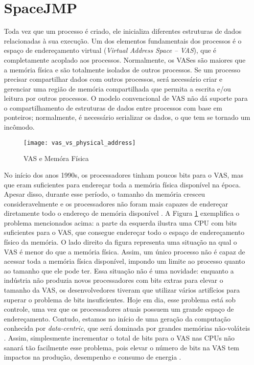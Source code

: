 \section{SpaceJMP}
\label{sec:mvas}

Toda vez que um processo é criado, ele inicializa diferentes estruturas de
dados relacionadas à sua execução. Um dos elementos fundamentais dos processos
é o espaço de endereçamento virtual (\emph{Virtual Address Space -- VAS}), que é
completamente acoplado aos processos. Normalmente, os VASes são maiores que a
memória física e são totalmente isolados de outros processos. Se um processo
precisar compartilhar dados com outros processos, será necessário criar e
gerenciar uma região de memória compartilhada que permita a escrita e/ou leitura
por outros processos. O modelo convencional de VAS não dá suporte para
o compartilhamento de estruturas de dados entre processos com base em ponteiros;
normalmente, é necessário serializar os dados, o que tem se tornado um incômodo.

\begin{figure}[!h]
  \centering
  \texttt{[image: vas\_vs\_physical\_address]} 
  \caption{VAS e Memóra Física}
  \label{fig:vas_vs_physical} 
\end{figure}

No início dos anos 1990s, os processadores tinham poucos bits para o VAS, mas que eram suficientes
para endereçar toda a memória física disponível na época. Apesar disso, durante
esse período, o tamanho da memória cresceu consideravelmente e os processadores
não foram mais capazes de endereçar diretamente todo o endereço de memória disponível
\citep{crowley}. A Figura \ref{fig:vas_vs_physical} exemplifica o problema
mencionados acima: a parte da esquerda ilustra uma CPU com bits suficientes
para o VAS, que consegue endereçar todo o espaço de endereçamento
físico da memória. O lado direito da figura representa uma situação na qual o
VAS é menor do que a memória física. Assim, um único processo não é capaz de
acessar toda a memória física disponível, impondo um limite ao processo
quanto ao tamanho que ele pode ter. Essa situação
não é uma novidade: enquanto a indústria não produzia
novos processadores com bits extras para elevar o tamanho da VAS, os
desenvolvedores tiveram que utilizar vários artifícios para superar o
problema de bits insuficientes. Hoje em dia, esse problema está sob controle,
uma vez que os processadores atuais possuem um grande espaço de endereçamento.
Contudo, estamos no início de uma geração da computação conhecida por
\emph{data-centric}, que será dominada por grandes memórias não-voláteis
\citep{outlook}. Assim, simplesmente incrementar o total de bits para o VAS nas
CPUs não sanará tão facilmente esse problema, pois elevar o número de bits na
VAS tem impactos na produção, desempenho e consumo de energia \citep{spacejmp}.

